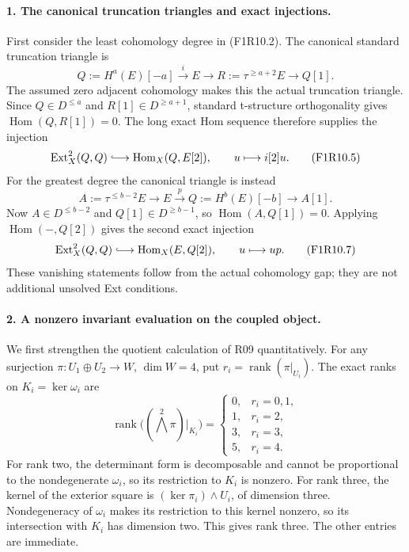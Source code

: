 \paragraph{1. The canonical truncation triangles and exact injections.}
First consider the least cohomology degree in (F1R10.2). The
canonical standard truncation triangle is
\[
 Q:=H^a(E)[-a]\xrightarrow{i}E\longrightarrow
 R:=\tau^{\ge a+2}E\longrightarrow Q[1].
 \tag{F1R10.4}
\]
The assumed zero adjacent cohomology makes this the actual
truncation triangle. Since $Q\in D^{\le a}$ and
$R[1]\in D^{\ge a+1}$, standard t-structure orthogonality gives
$\operatorname{Hom}(Q,R[1])=0$. The long exact Hom sequence
therefore supplies the injection
\[
 \operatorname{Ext}^2_X(Q,Q)\lhook\joinrel\longrightarrow
         \operatorname{Hom}_X(Q,E[2]),\qquad
 u\longmapsto i[2]u.
 \tag{F1R10.5}
\]
For the greatest degree the canonical triangle is instead
\[
 A:=\tau^{\le b-2}E\longrightarrow E
       \xrightarrow{p}Q:=H^b(E)[-b]\longrightarrow A[1].
 \tag{F1R10.6}
\]
Now $A\in D^{\le b-2}$ and $Q[1]\in D^{\ge b-1}$, so
$\operatorname{Hom}(A,Q[1])=0$. Applying
$\operatorname{Hom}(-,Q[2])$ gives the second exact injection
\[
 \operatorname{Ext}^2_X(Q,Q)\lhook\joinrel\longrightarrow
         \operatorname{Hom}_X(E,Q[2]),\qquad
 u\longmapsto up.
 \tag{F1R10.7}
\]
These vanishing statements follow from the actual cohomology
gap; they are not additional unsolved Ext conditions.

\paragraph{2. A nonzero invariant evaluation on the coupled object.}
We first strengthen the quotient calculation of R09 quantitatively.
For any surjection $\pi:U_1\oplus U_2\to W$, $\dim W=4$, put
$r_i=\operatorname{rank}(\pi|_{U_i})$. The exact ranks on
$K_i=\ker\omega_i$ are
\[
 \operatorname{rank}\bigl((\bigwedge^2\pi)|_{K_i}\bigr)
 =\begin{cases}
 0,&r_i=0,1,\\
 1,&r_i=2,\\
 3,&r_i=3,\\
 5,&r_i=4.
 \end{cases}
 \tag{F1R10.8a}
\]
For rank two, the determinant form is decomposable and cannot
be proportional to the nondegenerate $\omega_i$, so its
restriction to $K_i$ is nonzero. For rank three, the kernel
of the exterior square is $(\ker\pi_i)\wedge U_i$, of dimension
three. Nondegeneracy of $\omega_i$ makes its restriction to
this kernel nonzero, so its intersection with $K_i$ has
dimension two. This gives rank three. The other entries
are immediate.

